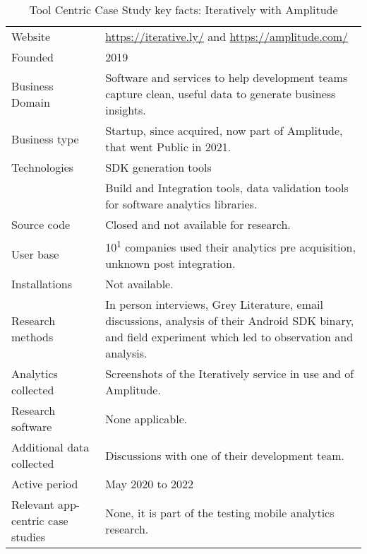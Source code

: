 {\renewcommand{\arraystretch}{0.8}%
\begin{table*}
    \centering
    \small
    \setlength{\tabcolsep}{6pt}
    \begin{tabular}{lp{9cm}}
       \toprule
       Website &\url{https://iterative.ly/} and \url{https://amplitude.com/} \\
       Founded & 2019 \\ %
       Business Domain & Software and services to help development teams capture clean, useful data to generate business insights. \\ %
       Business type & Startup, since acquired, now part of Amplitude, that went Public in 2021. \\
       Technologies  & SDK generation tools \\
       & Build and Integration tools, data validation tools for software analytics libraries. \\
       Source code  &Closed and not available for research. \\
       \arrayrulecolor{blue!20}\midrule
       User base & 10\textsuperscript{1} companies used their analytics pre acquisition, unknown post integration. \\
       Installations & Not available.  \\
       \arrayrulecolor{blue!20}\midrule
       Research methods &In person interviews, Grey Literature, email discussions, analysis of their Android SDK binary, and field experiment which led to observation and analysis. \\
       Analytics collected & Screenshots of the Iteratively service in use and of Amplitude. \\
       Research software & None applicable. \\
       Additional data collected &Discussions with one of their development team. \\
       Active period & May 2020 to 2022 \\
       Relevant app-centric case studies & None, it is part of the testing mobile analytics research. \\
       \bottomrule
    \end{tabular}
    \caption{Tool Centric Case Study key facts: Iteratively with Amplitude}
    \label{tab:iteratively_with_amplitude_anaytics_overview}
\end{table*}
}

